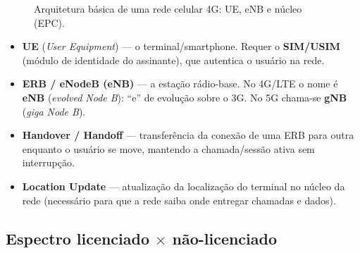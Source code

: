\documentclass[11pt,a4paper]{article}
\begin{document}
\begin{figure}[h!]
\centering
{}
\caption{Arquitetura básica de uma rede celular 4G: UE, eNB e núcleo (EPC).}
\label{fig:componentes}
\end{figure}

\begin{itemize}
    \item \textbf{UE} (\textit{User Equipment}) --- o terminal/smartphone. Requer o \textbf{SIM/USIM} (módulo de identidade do assinante), que autentica o usuário na rede.
    \item \textbf{ERB / eNodeB (eNB)} --- a estação rádio-base. No 4G/LTE o nome é \textbf{eNB} (\textit{evolved Node B}): ``e'' de evolução sobre o 3G. No 5G chama-se \textbf{gNB} (\textit{giga Node B}).
    \item \textbf{Handover / Handoff} --- transferência da conexão de uma ERB para outra enquanto o usuário se move, mantendo a chamada/sessão ativa sem interrupção.
    \item \textbf{Location Update} --- atualização da localização do terminal no núcleo da rede (necessário para que a rede saiba onde entregar chamadas e dados).
\end{itemize}

\subsection{Espectro licenciado $\times$ não-licenciado}
\end{document}
